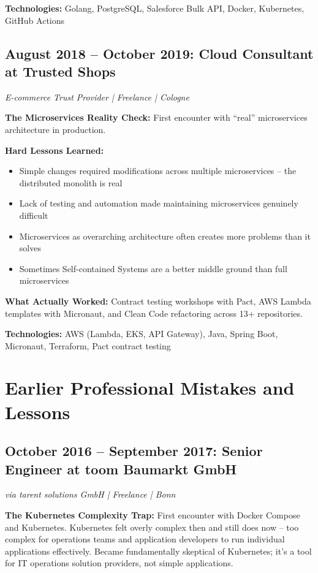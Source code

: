 \documentclass[11pt,a4paper]{article}
\begin{document}
\textbf{Technologies:} Golang, PostgreSQL, Salesforce Bulk API, Docker, Kubernetes, GitHub Actions

\vspace{6pt}

\subsection{August 2018 -- October 2019: Cloud Consultant at Trusted Shops}
\textit{E-commerce Trust Provider | Freelance | Cologne}

\textbf{The Microservices Reality Check:} First encounter with ``real'' microservices architecture in production.

\textbf{Hard Lessons Learned:}
\begin{itemize}[leftmargin=15pt, topsep=0pt, itemsep=2pt]
\item Simple changes required modifications across multiple microservices -- the distributed monolith is real
\item Lack of testing and automation made maintaining microservices genuinely difficult
\item Microservices as overarching architecture often creates more problems than it solves
\item Sometimes Self-contained Systems are a better middle ground than full microservices
\end{itemize}

\textbf{What Actually Worked:} Contract testing workshops with Pact, AWS Lambda templates with Micronaut, and Clean Code refactoring across 13+ repositories.

\textbf{Technologies:} AWS (Lambda, EKS, API Gateway), Java, Spring Boot, Micronaut, Terraform, Pact contract testing

\newpage

\section{Earlier Professional Mistakes and Lessons}

\subsection{October 2016 -- September 2017: Senior Engineer at toom Baumarkt GmbH}
\textit{via tarent solutions GmbH | Freelance | Bonn}

\textbf{The Kubernetes Complexity Trap:} First encounter with Docker Compose and Kubernetes. Kubernetes felt overly complex then and still does now -- too complex for operations teams and application developers to run individual applications effectively. Became fundamentally skeptical of Kubernetes; it's a tool for IT operations solution providers, not simple applications.
\end{document}
